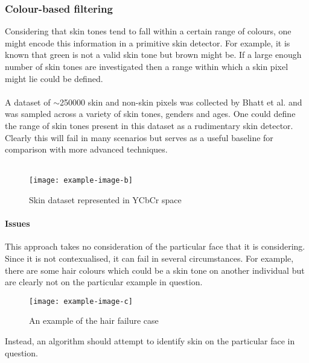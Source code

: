 \subsubsection{Colour-based filtering}
Considering that skin tones tend to fall within a certain range of colours, one might encode this information in a primitive skin detector. For example, it is known that green is not a valid skin tone but brown might be. If a large enough number of skin tones are investigated then a range within which a skin pixel might lie could be defined. 
\\ \\
A dataset of $\sim$250000 skin and non-skin pixels was collected by Bhatt et al. \cite{skinDataset} and was sampled across a variety of skin tones, genders and ages. One could define the range of skin tones present in this dataset as a rudimentary skin detector. Clearly this will fail in many scenarios but serves as a useful baseline for comparison with more advanced techniques.
\\ \\

\begin{figure}[!h]
    \texttt{[image: example-image-b]}
   \caption{Skin dataset represented in YCbCr space} 
\end{figure}
\paragraph{Issues}
This approach takes no consideration of the particular face that it is considering. Since it is not contexualised, it can fail in several circumstances.
For example, there are some hair colours which could be a skin tone on another individual but are clearly not on the particular example in question.
\begin{figure}[!h]
    \texttt{[image: example-image-c]}
   \caption{An example of the hair failure case} 
\end{figure}
Instead, an algorithm should attempt to identify skin on the particular face in question.

